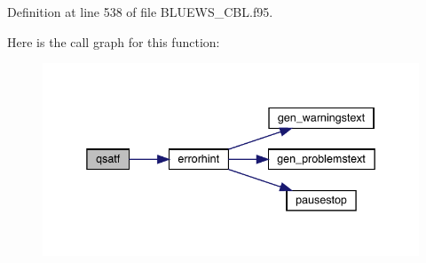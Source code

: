 Definition at line 538 of file B\+L\+U\+E\+W\+S\+\_\+\+C\+B\+L.\+f95.

Here is the call graph for this function\+:\nopagebreak
\begin{figure}[H]
\begin{center}
\leavevmode
\includegraphics[width=338pt]{_b_l_u_e_w_s___c_b_l_8f95_a67036afb2f40fef682aefc6df6d0c311_cgraph}
\end{center}
\end{figure}
